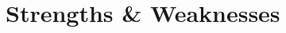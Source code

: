 \documentclass[10pt, a4paper, twocolumn]{article}
\begin{document}



%
%
%
%
%





\clearpage

\section*{Strengths \& Weaknesses}
\end{document}
